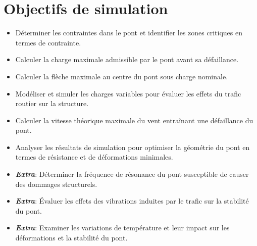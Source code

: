 \documentclass{article}
\begin{document}
\section{Objectifs de simulation}

\begin{itemize}
    \item Déterminer les contraintes dans le pont et identifier les zones critiques en termes de contrainte.
    \item Calculer la charge maximale admissible par le pont avant sa défaillance.
    \item Calculer la flèche maximale au centre du pont sous charge nominale.
    \item Modéliser et simuler les charges variables pour évaluer les effets du trafic routier sur la structure.
    \item Calculer la vitesse théorique maximale du vent entraînant une défaillance du pont.
    \item Analyser les résultats de simulation pour optimiser la géométrie du pont en termes de résistance et de déformations minimales.
    \item \textit{\textbf{Extra}}: Déterminer la fréquence de résonance du pont susceptible de causer des dommages structurels.
    \item \textit{\textbf{Extra}}: Évaluer les effets des vibrations induites par le trafic sur la stabilité du pont.
    \item \textit{\textbf{Extra}}: Examiner les variations de température et leur impact sur les déformations et la stabilité du pont.

\end{itemize}
\end{document}
